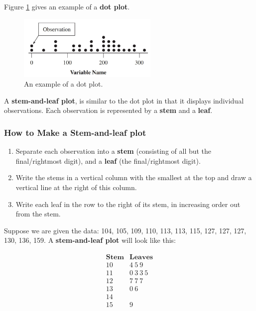Figure \ref{fig:dot_plot.jpg} gives an example of a \textbf{dot plot}.

\begin{figure}[h!]
\centering
\includegraphics[width=0.6\textwidth]{figures/dot_plot.jpg}
\caption{An example of a dot plot.}
\label{fig:dot_plot.jpg}
\end{figure}

A \textbf{stem-and-leaf plot}, is similar to the dot plot in that it displays individual observations. Each observation is represented by a \textbf{stem} and a \textbf{leaf}.

\subsubsection*{How to Make a Stem-and-leaf plot}
\begin{enumerate}
    \item Separate each observation into a \textbf{stem} (consisting of all but the final/rightmost digit), and a \textbf{leaf} (the final/rightmost digit).
    \item Write the stems in a vertical column with the smallest at the top and draw a vertical line at the right of this column.
    \item Write each leaf in the row to the right of its stem, in increasing order out from the stem.
\end{enumerate}

Suppose we are given the data: 104, 105, 109, 110, 113, 113, 115, 127, 127, 127, 130, 136, 159. A \textbf{stem-and-leaf plot} will look like this:

\[
\begin{array}{c|l}
\textbf{Stem} & \textbf{Leaves} \\
\hline
10 & 4 \ 5 \ 9 \\
11 & 0 \ 3 \ 3 \ 5 \\
12 & 7 \ 7 \ 7 \\
13 & 0 \ 6 \\
14 & \\
15 & 9 \\
\end{array}
\]

